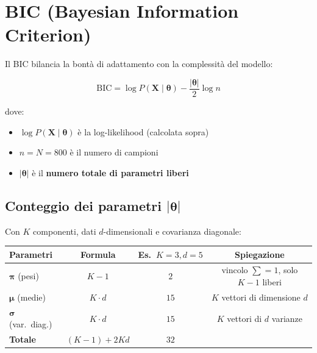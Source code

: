 \documentclass[11pt,a4paper]{article}
\begin{document}
\section{BIC (Bayesian Information Criterion)}

Il BIC bilancia la bont\`a di adattamento con la complessit\`a del modello:

\begin{equation}
    \boxed{\text{BIC} = \log P(\mathbf{X}\mid\boldsymbol{\theta}) - \frac{|\boldsymbol{\theta}|}{2}\log n}
\end{equation}

dove:
\begin{itemize}
    \item $\log P(\mathbf{X}\mid\boldsymbol{\theta})$ \`e la log-likelihood (calcolata sopra)
    \item $n = N = 800$ \`e il numero di campioni
    \item $|\boldsymbol{\theta}|$ \`e il \textbf{numero totale di parametri liberi}
\end{itemize}

\subsection{Conteggio dei parametri $|\boldsymbol{\theta}|$}

Con $K$ componenti, dati $d$-dimensionali e covarianza diagonale:

\begin{center}
\begin{tabular}{lccc}
    \toprule
    \textbf{Parametri} & \textbf{Formula} & \textbf{Es.\ $K\!=\!3, d\!=\!5$} & \textbf{Spiegazione} \\
    \midrule
    $\boldsymbol{\pi}$ (pesi) & $K - 1$ & $2$ & vincolo $\sum = 1$, solo $K\!-\!1$ liberi \\
    $\boldsymbol{\mu}$ (medie) & $K \cdot d$ & $15$ & $K$ vettori di dimensione $d$ \\
    $\boldsymbol{\sigma}$ (var.\ diag.) & $K \cdot d$ & $15$ & $K$ vettori di $d$ varianze \\
    \midrule
    \textbf{Totale} & $(K\!-\!1) + 2Kd$ & $32$ & \\
    \bottomrule
\end{tabular}
\end{center}
\end{document}
